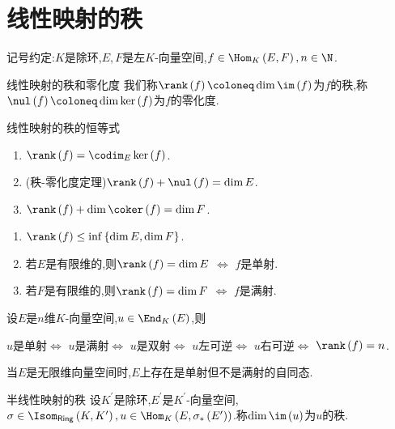 \section{线性映射的秩}

记号约定:$K$是除环,$E,F$是左$K$-向量空间,$f\in\Hom_{K}\left(E,F\right),n\in\N$.

\begin{definition}{线性映射的秩和零化度}{}
	我们称$\rank\left(f\right)\coloneq\dim\im\left(f\right)$为$f$的秩,称$\nul\left(f\right)\coloneq\dim\ker\left(f\right)$为$f$的零化度.
\end{definition}

\begin{proposition}{线性映射的秩的恒等式}{}
	\begin{enumerate}
		\item $\rank\left(f\right)=\codim_{E}\ker\left(f\right)$.
		\item (秩-零化度定理)$\rank\left(f\right)+\nul\left(f\right)=\dim E$.
		\item $\rank\left(f\right)+\dim\coker\left(f\right)=\dim F$.
	\end{enumerate}
\end{proposition}

\begin{proposition}{}{}
	\begin{enumerate}
		\item $\rank\left(f\right)\leq\inf\left\{\dim E,\dim F\right\}$.
		\item 若$E$是有限维的,则$\rank\left(f\right)=\dim E$ $\iff$ $f$是单射.
		\item 若$F$是有限维的,则$\rank\left(f\right)=\dim F$ $\iff$ $f$是满射.
	\end{enumerate}
\end{proposition}

\begin{corollary}{}{}
	设$E$是$n$维$K$-向量空间,$u\in\End_{K}\left(E\right)$,则
	\begin{center}
		$u$是单射$\iff$ $u$是满射$\iff$ $u$是双射$\iff$ $u$左可逆$\iff$ $u$右可逆$\iff$ $\rank\left(f\right)=n$.
	\end{center}
\end{corollary}

\begin{remark}{}{}
	当$E$是无限维向量空间时,$E$上存在是单射但不是满射的自同态.
\end{remark}

\begin{definition}{半线性映射的秩}{}
	设$K^{\prime}$是除环,$E^{\prime}$是$K^{\prime}$-向量空间,$\sigma\in\Isom_{\mathsf{Ring}}\left(K,K^{\prime}\right),u\in\Hom_{K}\left(E,\sigma_{\ast}\left(E^{\prime}\right)\right)$.称$\dim\im\left(u\right)$为$u$的秩.
\end{definition}


